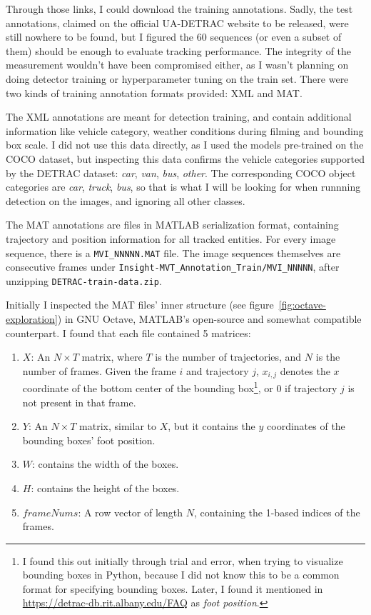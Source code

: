 Through those links, I could download the training annotations. Sadly, the test annotations, claimed on the official UA-DETRAC website to be released, were still nowhere to be found, but I figured the 60 sequences (or even a subset of them) should be enough to evaluate tracking performance. The integrity of the measurement wouldn't have been compromised either, as I wasn't planning on doing detector training or hyperparameter tuning on the train set. There were two kinds of training annotation formats provided: XML and MAT.

The XML annotations are meant for detection training, and contain additional information like vehicle category, weather conditions during filming and bounding box scale. I did not use this data directly, as I used the models pre-trained on the COCO dataset, but inspecting this data confirms the vehicle categories supported by the DETRAC dataset: \textit{car}, \textit{van}, \textit{bus}, \textit{other}. The corresponding COCO object categories are \textit{car}, \textit{truck}, \textit{bus}, so that is what I will be looking for when runnning detection on the images, and ignoring all other classes.

The MAT annotations are files in MATLAB serialization format, containing trajectory and position information for all tracked entities. For every image sequence, there is a \verb|MVI_NNNNN.MAT| file.
The image sequences themselves are consecutive frames under \verb|Insight-MVT_Annotation_Train/MVI_NNNNN|, after unzipping \verb|DETRAC-train-data.zip|.

Initially I inspected the MAT files' inner structure (see figure~\ref{fig:octave-exploration}) in GNU Octave, MATLAB's open-source and somewhat compatible counterpart. I found that each file contained 5 matrices:
\begin{enumerate}
    \item{$X$: An $N \times T$ matrix, where $T$ is the number of trajectories, and $N$ is the number of frames. Given the frame $i$ and trajectory $j$, $x_{i,j}$ denotes the $x$ coordinate of the bottom center of the bounding box\footnote{I found this out initially through trial and error, when trying to visualize bounding boxes in Python, because I did not know this to be a common format for specifying bounding boxes. Later, I found it mentioned in \url{https://detrac-db.rit.albany.edu/FAQ} as \textit{foot position}.}, or $0$ if trajectory $j$ is not present in that frame.}
    \item{$Y$: An $N \times T$ matrix, similar to $X$, but it contains the $y$ coordinates of the bounding boxes' foot position.}
    \item{$W$: contains the width of the boxes.}
    \item{$H$: contains the height of the boxes.}
    \item{$frameNums$: A row vector of length $N$, containing the 1-based indices of the frames.}
\end{enumerate}

